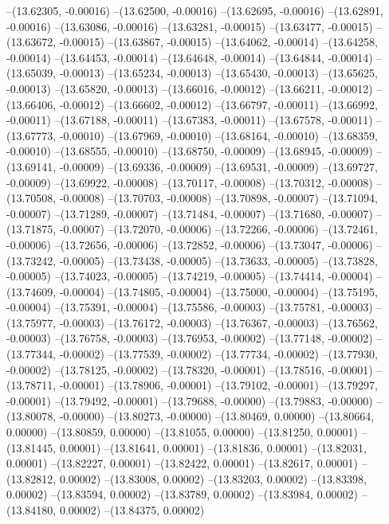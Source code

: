 --(13.62305, -0.00016)
--(13.62500, -0.00016)
--(13.62695, -0.00016)
--(13.62891, -0.00016)
--(13.63086, -0.00016)
--(13.63281, -0.00015)
--(13.63477, -0.00015)
--(13.63672, -0.00015)
--(13.63867, -0.00015)
--(13.64062, -0.00014)
--(13.64258, -0.00014)
--(13.64453, -0.00014)
--(13.64648, -0.00014)
--(13.64844, -0.00014)
--(13.65039, -0.00013)
--(13.65234, -0.00013)
--(13.65430, -0.00013)
--(13.65625, -0.00013)
--(13.65820, -0.00013)
--(13.66016, -0.00012)
--(13.66211, -0.00012)
--(13.66406, -0.00012)
--(13.66602, -0.00012)
--(13.66797, -0.00011)
--(13.66992, -0.00011)
--(13.67188, -0.00011)
--(13.67383, -0.00011)
--(13.67578, -0.00011)
--(13.67773, -0.00010)
--(13.67969, -0.00010)
--(13.68164, -0.00010)
--(13.68359, -0.00010)
--(13.68555, -0.00010)
--(13.68750, -0.00009)
--(13.68945, -0.00009)
--(13.69141, -0.00009)
--(13.69336, -0.00009)
--(13.69531, -0.00009)
--(13.69727, -0.00009)
--(13.69922, -0.00008)
--(13.70117, -0.00008)
--(13.70312, -0.00008)
--(13.70508, -0.00008)
--(13.70703, -0.00008)
--(13.70898, -0.00007)
--(13.71094, -0.00007)
--(13.71289, -0.00007)
--(13.71484, -0.00007)
--(13.71680, -0.00007)
--(13.71875, -0.00007)
--(13.72070, -0.00006)
--(13.72266, -0.00006)
--(13.72461, -0.00006)
--(13.72656, -0.00006)
--(13.72852, -0.00006)
--(13.73047, -0.00006)
--(13.73242, -0.00005)
--(13.73438, -0.00005)
--(13.73633, -0.00005)
--(13.73828, -0.00005)
--(13.74023, -0.00005)
--(13.74219, -0.00005)
--(13.74414, -0.00004)
--(13.74609, -0.00004)
--(13.74805, -0.00004)
--(13.75000, -0.00004)
--(13.75195, -0.00004)
--(13.75391, -0.00004)
--(13.75586, -0.00003)
--(13.75781, -0.00003)
--(13.75977, -0.00003)
--(13.76172, -0.00003)
--(13.76367, -0.00003)
--(13.76562, -0.00003)
--(13.76758, -0.00003)
--(13.76953, -0.00002)
--(13.77148, -0.00002)
--(13.77344, -0.00002)
--(13.77539, -0.00002)
--(13.77734, -0.00002)
--(13.77930, -0.00002)
--(13.78125, -0.00002)
--(13.78320, -0.00001)
--(13.78516, -0.00001)
--(13.78711, -0.00001)
--(13.78906, -0.00001)
--(13.79102, -0.00001)
--(13.79297, -0.00001)
--(13.79492, -0.00001)
--(13.79688, -0.00000)
--(13.79883, -0.00000)
--(13.80078, -0.00000)
--(13.80273, -0.00000)
--(13.80469, 0.00000)
--(13.80664, 0.00000)
--(13.80859, 0.00000)
--(13.81055, 0.00000)
--(13.81250, 0.00001)
--(13.81445, 0.00001)
--(13.81641, 0.00001)
--(13.81836, 0.00001)
--(13.82031, 0.00001)
--(13.82227, 0.00001)
--(13.82422, 0.00001)
--(13.82617, 0.00001)
--(13.82812, 0.00002)
--(13.83008, 0.00002)
--(13.83203, 0.00002)
--(13.83398, 0.00002)
--(13.83594, 0.00002)
--(13.83789, 0.00002)
--(13.83984, 0.00002)
--(13.84180, 0.00002)
--(13.84375, 0.00002)
